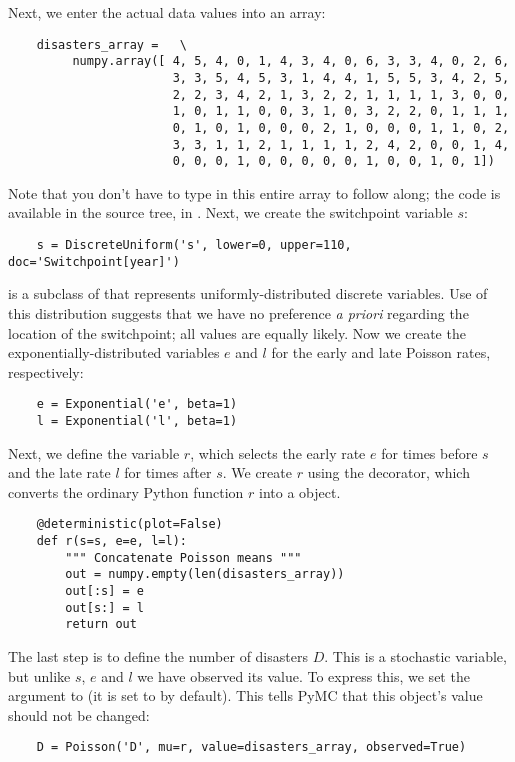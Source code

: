 Next, we enter the actual data values into an array:
\begin{verbatim}
	disasters_array =   \
	     numpy.array([ 4, 5, 4, 0, 1, 4, 3, 4, 0, 6, 3, 3, 4, 0, 2, 6,
	                   3, 3, 5, 4, 5, 3, 1, 4, 4, 1, 5, 5, 3, 4, 2, 5,
	                   2, 2, 3, 4, 2, 1, 3, 2, 2, 1, 1, 1, 1, 3, 0, 0,
	                   1, 0, 1, 1, 0, 0, 3, 1, 0, 3, 2, 2, 0, 1, 1, 1,
	                   0, 1, 0, 1, 0, 0, 0, 2, 1, 0, 0, 0, 1, 1, 0, 2,
	                   3, 3, 1, 1, 2, 1, 1, 1, 1, 2, 4, 2, 0, 0, 1, 4,
	                   0, 0, 0, 1, 0, 0, 0, 0, 0, 1, 0, 0, 1, 0, 1])
\end{verbatim}
Note that you don't have to type in this entire array to follow along; the code is available in the source tree, in .  Next, we create the switchpoint variable $s$:
\begin{verbatim}
	s = DiscreteUniform('s', lower=0, upper=110, doc='Switchpoint[year]')
\end{verbatim}
 is a subclass of  that represents uniformly-distributed discrete variables. Use of this distribution suggests that we have no preference \emph{a priori} regarding the location of the switchpoint; all values are equally likely. Now we create the exponentially-distributed variables $e$ and $l$ for the early and late Poisson rates, respectively:
\begin{verbatim}
	e = Exponential('e', beta=1)
	l = Exponential('l', beta=1)
\end{verbatim}
Next, we define the variable $r$, which selects the early rate $e$ for times before $s$ and the late rate $l$ for times after $s$. We create $r$ using the  decorator, which converts the ordinary Python function $r$ into a  object.
\begin{verbatim}
	@deterministic(plot=False)
	def r(s=s, e=e, l=l):
		""" Concatenate Poisson means """
	    out = numpy.empty(len(disasters_array))
	    out[:s] = e
	    out[s:] = l
	    return out
\end{verbatim}
The last step is to define the number of disasters $D$. This is a stochastic variable, but unlike $s$, $e$ and $l$ we have observed its value. To express this, we set the argument  to  (it is set to  by default). This tells PyMC that this object's value should not be changed:
\begin{verbatim}
	D = Poisson('D', mu=r, value=disasters_array, observed=True)
\end{verbatim}

